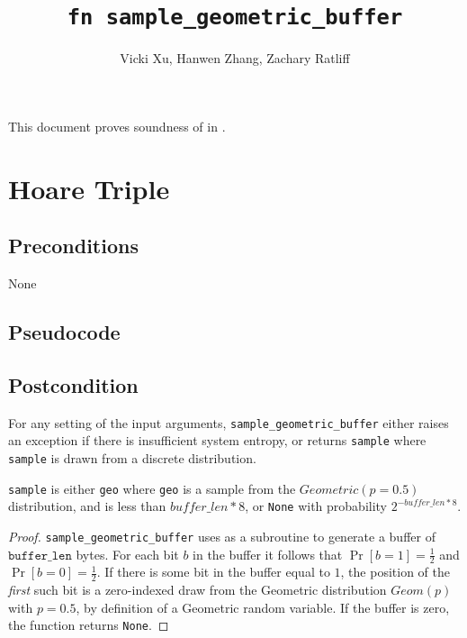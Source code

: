 \documentclass{article}
\title{\texttt{fn sample\_geometric\_buffer}}
\author{Vicki Xu, Hanwen Zhang, Zachary Ratliff}
\begin{document}
\maketitle

This document proves soundness of  in .

\section{Hoare Triple}
\subsection*{Preconditions}
None

\subsection*{Pseudocode}


\subsection*{Postcondition}
For any setting of the input arguments, \texttt{sample\_geometric\_buffer} either
raises an exception if there is insufficient system entropy, 
or returns \texttt{sample} where \texttt{sample} is drawn from a discrete distribution.

\texttt{sample} is either 
\texttt{geo} where \texttt{geo} is a sample from the $Geometric(p=0.5)$ distribution, and is less than $buffer\_len * 8$, or
\texttt{None} with probability $2^{-buffer\_len * 8}$.

\begin{proof}
    \texttt{sample\_geometric\_buffer} uses  as a subroutine to generate a buffer of $\texttt{buffer\_len}$ bytes.
    For each bit $b$ in the buffer it follows that $\Pr[b = 1] = \frac{1}{2}$ and $\Pr[b = 0] = \frac{1}{2}$. 
    If there is some bit in the buffer equal to $1$, 
    the position of the \emph{first} such bit is a zero-indexed draw from the Geometric distribution $Geom(p)$ with $p = 0.5$,
    by definition of a Geometric random variable. 
    If the buffer is zero, the function returns \texttt{None}. 
\end{proof}
\end{document}
